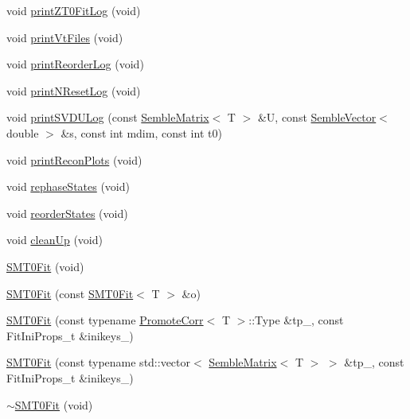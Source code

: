 \begin{DoxyCompactItemize}
void \mbox{\hyperlink{structSEMBLE_1_1SMT0Fit_af8e7b3bd0f80d0f4eda9c02d0aa89912}{print\+Z\+T0\+Fit\+Log}} (void)
\item 
void \mbox{\hyperlink{structSEMBLE_1_1SMT0Fit_a20e4a3b9231871541c881902ff0da2a3}{print\+Vt\+Files}} (void)
\item 
void \mbox{\hyperlink{structSEMBLE_1_1SMT0Fit_aa25369b9c7a77b7be15294eabd75427d}{print\+Reorder\+Log}} (void)
\item 
void \mbox{\hyperlink{structSEMBLE_1_1SMT0Fit_a45f5b6b87ab4828a73de4150eec496b1}{print\+N\+Reset\+Log}} (void)
\item 
void \mbox{\hyperlink{structSEMBLE_1_1SMT0Fit_a054737215697a880fe9feedacb6ffb61}{print\+S\+V\+D\+U\+Log}} (const \mbox{\hyperlink{structSEMBLE_1_1SembleMatrix}{Semble\+Matrix}}$<$ T $>$ \&U, const \mbox{\hyperlink{structSEMBLE_1_1SembleVector}{Semble\+Vector}}$<$ double $>$ \&s, const int mdim, const int t0)
\item 
void \mbox{\hyperlink{structSEMBLE_1_1SMT0Fit_af22140ceb91751e0397e099be80e4e26}{print\+Recon\+Plots}} (void)
\item 
void \mbox{\hyperlink{structSEMBLE_1_1SMT0Fit_ae6cc499f68d4bdb3b9c355fcde7905f7}{rephase\+States}} (void)
\item 
void \mbox{\hyperlink{structSEMBLE_1_1SMT0Fit_a173df18017871b3d27ae10eb16422224}{reorder\+States}} (void)
\item 
void \mbox{\hyperlink{structSEMBLE_1_1SMT0Fit_af7fdbb36395ef2aa852a7735405b3421}{clean\+Up}} (void)
\item 
\mbox{\hyperlink{structSEMBLE_1_1SMT0Fit_a7fe742a611df3fc26dfde896488115e8}{S\+M\+T0\+Fit}} (void)
\item 
\mbox{\hyperlink{structSEMBLE_1_1SMT0Fit_a90127081fe33f0fe4cab0bbb2060b04e}{S\+M\+T0\+Fit}} (const \mbox{\hyperlink{structSEMBLE_1_1SMT0Fit}{S\+M\+T0\+Fit}}$<$ T $>$ \&o)
\item 
\mbox{\hyperlink{structSEMBLE_1_1SMT0Fit_abadec4f589b30c47e8fbe7d7b821aae9}{S\+M\+T0\+Fit}} (const typename \mbox{\hyperlink{structSEMBLE_1_1PromoteCorr}{Promote\+Corr}}$<$ T $>$\+::Type \&tp\+\_\+, const Fit\+Ini\+Props\+\_\+t \&inikeys\+\_\+)
\item 
\mbox{\hyperlink{structSEMBLE_1_1SMT0Fit_a048a03a78f499dc1186691afc5ff770d}{S\+M\+T0\+Fit}} (const typename std\+::vector$<$ \mbox{\hyperlink{structSEMBLE_1_1SembleMatrix}{Semble\+Matrix}}$<$ T $>$ $>$ \&tp\+\_\+, const Fit\+Ini\+Props\+\_\+t \&inikeys\+\_\+)
\item 
\mbox{\hyperlink{structSEMBLE_1_1SMT0Fit_af661fa33d8fba83dbbc1f08f4c15c04e}{$\sim$\+S\+M\+T0\+Fit}} (void)

\end{DoxyCompactItemize}
